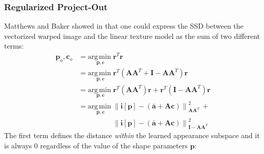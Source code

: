\subsubsection{Regularized Project-Out}
\label{sec:po}

Matthews and Baker showed in \cite{Matthews2004} that one could express the SSD between the vectorized warped image and the linear texture model as the sum of two different terms:
\begin{equation}
    \begin{aligned}
        \mathbf{p}_o, \mathbf{c}_o & =  \underset{\mathbf{p}, \mathbf{c}}{\mathrm{arg\,min\;}} \mathbf{r}^T \mathbf{r} 
        \\
        & = \underset{\mathbf{p}, \mathbf{c}}{\mathrm{arg\,min\;}} \mathbf{r}^T (\mathbf{A}\mathbf{A}^T + \mathbf{I} - \mathbf{A}\mathbf{A}^T) \mathbf{r}
        \\
        & = \underset{\mathbf{p}, \mathbf{c}}{\mathrm{arg\,min\;}} \mathbf{r}^T (\mathbf{A}\mathbf{A}^T) \mathbf{r} + \mathbf{r}^T (\mathbf{I} - \mathbf{A}\mathbf{A}^T) \mathbf{r}
        \\
        & = \underset{\mathbf{p}, \mathbf{c}}{\mathrm{arg\,min\;}} \left\| \mathbf{i}[\mathbf{p}] - \left( \bar{\mathbf{a}} + \mathbf{A} \mathbf{c} \right) \right\|_{\mathbf{A}\mathbf{A}^T}^2 \, + 
        \\
        & \qquad \qquad \,\,\,\,\, \left\| \mathbf{i}[\mathbf{p}] - \left( \bar{\mathbf{a}} + \mathbf{A} \mathbf{c} \right) \right\|_{\mathbf{I} - \mathbf{A}\mathbf{A}^T}^2
    \label{eq:po_cost}
    \end{aligned}
\end{equation}
The first term defines the distance \emph{within} the learned appearance subspace and it is always $0$ regardless of the value of the shape parameters $\mathbf{p}$:
